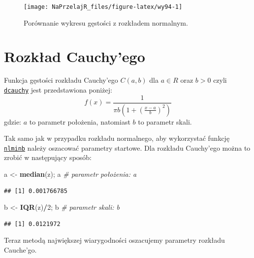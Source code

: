 \documentclass[polish,]{book}
\newenvironment{Shaded}{\begin{snugshade}}{\end{snugshade}}
\newcommand{\CommentTok}[1]{\textcolor[rgb]{0.56,0.35,0.01}{\textit{#1}}}
\newcommand{\DecValTok}[1]{\textcolor[rgb]{0.00,0.00,0.81}{#1}}
\newcommand{\KeywordTok}[1]{\textcolor[rgb]{0.13,0.29,0.53}{\textbf{#1}}}
\newcommand{\NormalTok}[1]{#1}
\newcommand{\OperatorTok}[1]{\textcolor[rgb]{0.81,0.36,0.00}{\textbf{#1}}}
\newcommand{\StringTok}[1]{\textcolor[rgb]{0.31,0.60,0.02}{#1}}
\begin{document}
\begin{figure}[h]

{\centering \texttt{[image: NaPrzelajR\_files/figure-latex/wy94-1]} 

}

\caption{Porównanie wykresu gęstości z rozkładem normalnym.}\label{fig:wy94}
\end{figure}

\hypertarget{part_9.4}{%
\section{Rozkład Cauchy'ego}\label{part_9.4}}

Funkcja gęstości rozkładu Cauchy'ego \(C(a, b)\) dla \(a \in R\) oraz \(b > 0\) czyli \href{https://rdrr.io/r/stats/Cauchy.html}{\texttt{dcauchy}} jest przedstawiona poniżej:
\begin{equation}
f(x)=\frac{1}{\pi b \left(1+\left(\frac{x-a}{b}\right)^2\right)}
\label{eq:wz921}
\end{equation}
gdzie: \(a\) to parametr położenia, natomiast \(b\) to parametr skali.

Tak samo jak w przypadku rozkładu normalnego, aby wykorzystać funkcję \href{https://rdrr.io/r/stats/nlminb.html}{\texttt{nlminb}} należy oszacować parametry startowe. Dla rozkładu Cauchy'ego można to zrobić w
następujący sposób:

\begin{Shaded}
\begin{Highlighting}[]
\NormalTok{a <-}\StringTok{ }\KeywordTok{median}\NormalTok{(z); a }\CommentTok{# parametr położenia: a}
\end{Highlighting}
\end{Shaded}

\begin{verbatim}
## [1] 0.001766785
\end{verbatim}

\begin{Shaded}
\begin{Highlighting}[]
\NormalTok{b <-}\StringTok{ }\KeywordTok{IQR}\NormalTok{(z)}\OperatorTok{/}\DecValTok{2}\NormalTok{; b  }\CommentTok{# parametr skali: b}
\end{Highlighting}
\end{Shaded}

\begin{verbatim}
## [1] 0.0121972
\end{verbatim}

Teraz metodą największej wiarygodności oszacujemy parametry rozkładu Cauche'go.
\end{document}
